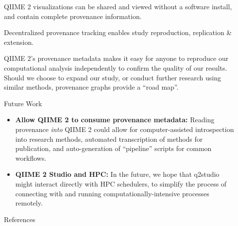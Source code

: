 \documentclass[final]{beamer}
\newlength{\sepwidth}
\newlength{\colwidth}
\newcommand{\separatorcolumn}{\begin{column}{\sepwidth}\end{column}}
\begin{document}
\begin{frame}[t]
\begin{columns}[t]
\begin{column}{\colwidth}
\begin{block}{QIIME 2 visualizations can be shared and viewed without a software install, and contain complete provenance information.}

  \end{block}

  \begin{block}{Decentralized provenance tracking enables study reproduction, replication \& extension.}

    QIIME 2’s provenance metadata makes it easy for anyone to reproduce our
    computational analysis independently to confirm the quality of our results.
    Should we choose to expand our study, or conduct further research using
    similar methods, provenance graphs provide a “road map”.

  \end{block}

  \begin{block}{Future Work}

    \begin{itemize}
      \item \textbf{Allow QIIME 2 to consume provenance metadata:} Reading
      provenance \textit{into} QIIME 2 could allow for computer-assisted
      introspection into research methods, automated transcription of methods
      for publication, and auto-generation of “pipeline” scripts for common workflows.
      \item \textbf{QIIME 2 Studio and HPC:} In the future, we hope that q2studio might interact
      directly with HPC schedulers, to simplify the process of connecting with
      and running computationally-intensive processes remotely.
    \end{itemize}

  \end{block}

  \begin{block}{References}

    \nocite{*}
    \footnotesize{}

  \end{block}

\end{column}

\separatorcolumn
\end{columns}
\end{frame}
\end{document}
